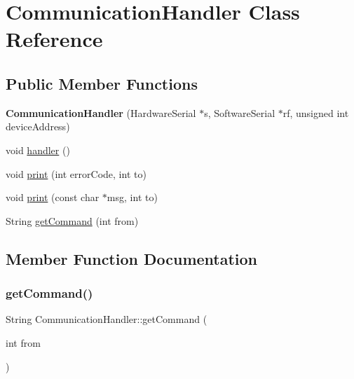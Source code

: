 \hypertarget{class_communication_handler}{}\section{Communication\+Handler Class Reference}
\label{class_communication_handler}
\subsection*{Public Member Functions}
\begin{DoxyCompactItemize}
\item 
\mbox{\label{class_communication_handler_a93c704605504708b1a5bbc687eae0036}} 
{\bfseries Communication\+Handler} (Hardware\+Serial $\ast$s, Software\+Serial $\ast$rf, unsigned int device\+Address)
\item 
void \hyperlink{class_communication_handler_a46bfbaf36bbe568f21e7d8b144785c93}{handler} ()
\item 
void \hyperlink{class_communication_handler_aac8445340aa425833ba870ddec125a1a}{print} (int error\+Code, int to)
\item 
void \hyperlink{class_communication_handler_a46989cd4824801824ac16afde03677d3}{print} (const char $\ast$msg, int to)
\item 
String \hyperlink{class_communication_handler_a7df59cf37a78cd4d77e7e9aec9b1ed32}{get\+Command} (int from)
\end{DoxyCompactItemize}


\subsection{Member Function Documentation}
\mbox{\label{class_communication_handler_a7df59cf37a78cd4d77e7e9aec9b1ed32}} 
\subsubsection{\texorpdfstring{get\+Command()}{getCommand()}}
{\footnotesize\ttfamily String Communication\+Handler\+::get\+Command (\begin{DoxyParamCaption}\item[{int}]{from }\end{DoxyParamCaption})}

